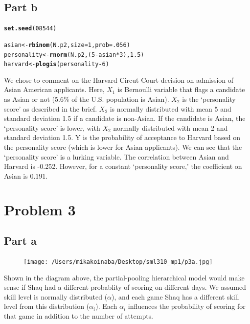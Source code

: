 \documentclass{article}\usepackage[]{graphicx}\usepackage[]{color}
\makeatletter
\newcommand{\hlnum}[1]{\textcolor[rgb]{0.686,0.059,0.569}{#1}}%
\newcommand{\hlopt}[1]{\textcolor[rgb]{0,0,0}{#1}}%
\newcommand{\hlstd}[1]{\textcolor[rgb]{0.345,0.345,0.345}{#1}}%
\newcommand{\hlkwb}[1]{\textcolor[rgb]{0.69,0.353,0.396}{#1}}%
\newcommand{\hlkwc}[1]{\textcolor[rgb]{0.333,0.667,0.333}{#1}}%
\newcommand{\hlkwd}[1]{\textcolor[rgb]{0.737,0.353,0.396}{\textbf{#1}}}%
\newenvironment{kframe}{%
 \def\at@end@of@kframe{}%
 \ifinner\ifhmode%
  \def\at@end@of@kframe{\end{minipage}}%
  \begin{minipage}{\columnwidth}%
 \fi\fi%
 \def\FrameCommand##1{\hskip\@totalleftmargin \hskip-\fboxsep
 \colorbox{shadecolor}{##1}\hskip-\fboxsep
     \hskip-\linewidth \hskip-\@totalleftmargin \hskip\columnwidth}%
 \MakeFramed {\advance\hsize-\width
   \@totalleftmargin\z@ \linewidth\hsize
   \@setminipage}}%
 {\par\unskip\endMakeFramed%
 \at@end@of@kframe}
\newenvironment{knitrout}{}{} %
\makeatother
\begin{document}
\subsection*{Part b}
\begin{knitrout}
\color{fgcolor}\begin{kframe}
\begin{alltt}
\hlkwd{set.seed}\hlstd{(}\hlnum{08544}\hlstd{)}

\hlstd{asian} \hlkwb{<-} \hlkwd{rbinom}\hlstd{(N.p2,} \hlkwc{size} \hlstd{=} \hlnum{1}\hlstd{,} \hlkwc{prob} \hlstd{=} \hlnum{.056}\hlstd{)}
\hlstd{personality} \hlkwb{<-} \hlkwd{rnorm}\hlstd{(N.p2, (}\hlnum{5} \hlopt{-} \hlstd{asian}\hlopt{*}\hlnum{3}\hlstd{),} \hlnum{1.5}\hlstd{)}
\hlstd{harvard} \hlkwb{<-} \hlkwd{plogis}\hlstd{(personality} \hlopt{-} \hlnum{6}\hlstd{)}
\end{alltt}
\end{kframe}
\end{knitrout}

\noindent We chose to comment on the Harvard Circut Court decision on admission of Asian American applicants. Here, $X_{1}$ is Bernoulli variable that flags a candidate as Asian or not (5.6\% of the U.S. population is Asian). $X_{2}$ is the `personality score' as described in the brief. $X_{2}$ is normally distributed with mean 5 and standard deviation 1.5 if a candidate is non-Asian. If the candidate is Asian, the `personality score' is lower, with $X_{2}$ normally distributed with mean 2 and standard deviation 1.5. Y is the probability of acceptance to Harvard based on the personality score (which is lower for Asian applicants). We can see that the `personality score' is a lurking variable. The correlation between Asian and Harvard is -0.252. However, for a constant `personality score,' the coefficient on Asian is 0.191. \\

\section*{Problem 3}
\subsection*{Part a}
\begin{figure}[h!]
\centering
\texttt{[image: /Users/mikakoinaba/Desktop/sml310\_mp1/p3a.jpg]}
\end{figure}
\noindent Shown in the diagram above, the partial-pooling hierarchical model would make sense if Shaq had a different probablity of scoring on different days. We assumed skill level is normally distributed ($\alpha$), and each game Shaq has a different skill level from this distribution ($\alpha_i$). Each $\alpha_i$ influences the probability of scoring for that game in addition to the number of attempts. \\ \pagebreak
\end{document}

